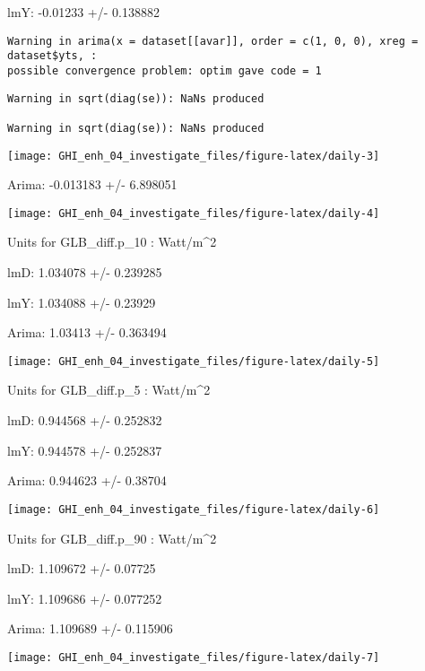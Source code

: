\documentclass[
  10pt,
  a4paper,oneside]{article}
\begin{document}
lmY: -0.01233 +/- 0.138882

\begin{verbatim}
Warning in arima(x = dataset[[avar]], order = c(1, 0, 0), xreg = dataset$yts, :
possible convergence problem: optim gave code = 1
\end{verbatim}

\begin{verbatim}
Warning in sqrt(diag(se)): NaNs produced

Warning in sqrt(diag(se)): NaNs produced
\end{verbatim}

\begin{center}\texttt{[image: GHI\_enh\_04\_investigate\_files/figure-latex/daily-3]} \end{center}

Arima: -0.013183 +/- 6.898051

\begin{center}\texttt{[image: GHI\_enh\_04\_investigate\_files/figure-latex/daily-4]} \end{center}

Units for GLB\_diff.p\_10 : Watt/m\^{}2

lmD: 1.034078 +/- 0.239285

lmY: 1.034088 +/- 0.23929

Arima: 1.03413 +/- 0.363494

\begin{center}\texttt{[image: GHI\_enh\_04\_investigate\_files/figure-latex/daily-5]} \end{center}

Units for GLB\_diff.p\_5 : Watt/m\^{}2

lmD: 0.944568 +/- 0.252832

lmY: 0.944578 +/- 0.252837

Arima: 0.944623 +/- 0.38704

\begin{center}\texttt{[image: GHI\_enh\_04\_investigate\_files/figure-latex/daily-6]} \end{center}

Units for GLB\_diff.p\_90 : Watt/m\^{}2

lmD: 1.109672 +/- 0.07725

lmY: 1.109686 +/- 0.077252

Arima: 1.109689 +/- 0.115906

\begin{center}\texttt{[image: GHI\_enh\_04\_investigate\_files/figure-latex/daily-7]} \end{center}
\end{document}
